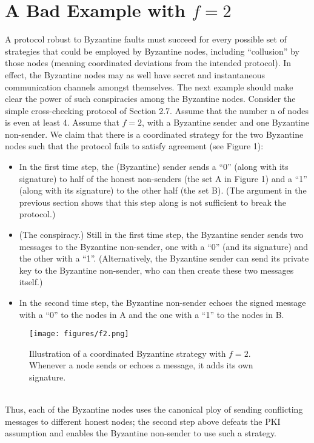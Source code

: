 \section{A Bad Example with $f = 2$}
A protocol robust to Byzantine faults must succeed for every possible set of strategies that
could be employed by Byzantine nodes, including “collusion” by those nodes (meaning coordinated deviations from the intended protocol). In effect, the Byzantine nodes may as
well have secret and instantaneous communication channels amongst themselves. The next
example should make clear the power of such conspiracies among the Byzantine nodes.
Consider the simple cross-checking protocol of Section 2.7. Assume that the number n of
nodes is even at least 4. Assume that $f = 2$, with a Byzantine sender and one Byzantine
non-sender. We claim that there is a coordinated strategy for the two Byzantine nodes such
that the protocol fails to satisfy agreement (see Figure 1):
\begin{itemize}
    \item In the first time step, the (Byzantine) sender sends a “0” (along with its signature)
to half of the honest non-senders (the set A in Figure 1) and a “1” (along with its
signature) to the other half (the set B). (The argument in the previous section shows
that this step along is not sufficient to break the protocol.)
    \item (The conspiracy.) Still in the first time step, the Byzantine sender sends two messages
to the Byzantine non-sender, one with a “0” (and its signature) and the other with
a “1”. (Alternatively, the Byzantine sender can send its private key to the Byzantine
non-sender, who can then create these two messages itself.)
    \item In the second time step, the Byzantine non-sender echoes the signed message with a
“0” to the nodes in A and the one with a “1” to the nodes in B.
\end{itemize}
\begin{figure}[h]
    \centering
    \texttt{[image: figures/f2.png]}
    \caption{Illustration of a coordinated Byzantine strategy with $f = 2$. Whenever
a node sends or echoes a message, it adds its own signature.}
    \label{fig:mesh1}
\end{figure}\\
Thus, each of the Byzantine nodes uses the canonical ploy of sending conflicting messages to
different honest nodes; the second step above defeats the PKI assumption and enables the
Byzantine non-sender to use such a strategy.
